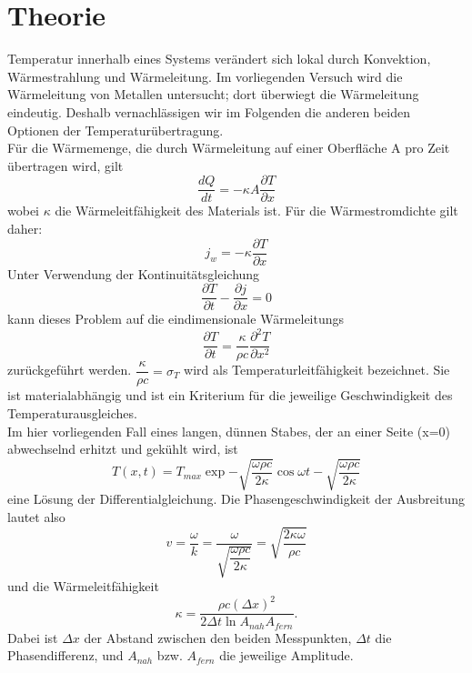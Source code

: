 \section{Theorie}
\label{sec:Theorie}

Temperatur innerhalb eines Systems verändert sich lokal durch Konvektion, Wärmestrahlung
und Wärmeleitung. Im vorliegenden Versuch wird die Wärmeleitung von Metallen untersucht;
dort überwiegt die Wärmeleitung eindeutig. Deshalb vernachlässigen wir im Folgenden die 
anderen beiden Optionen der Temperaturübertragung.\\
Für die Wärmemenge, die durch Wärmeleitung auf einer Oberfläche A pro Zeit übertragen 
wird, gilt
\begin{equation}
    \dfrac{dQ}{dt}=-\kappa A \dfrac{\partial T}{\partial x}
\end{equation}
wobei $\kappa$ die Wärmeleitfähigkeit des Materials ist. Für die Wärmestromdichte gilt 
daher:
\begin{equation}
    j_w=-\kappa \dfrac{\partial T}{\partial x}
\end{equation}
Unter Verwendung der Kontinuitätsgleichung
\begin{equation}
    \dfrac{\partial T}{\partial t}-\dfrac{\partial j}{\partial x}=0
\end{equation}
kann dieses Problem auf die eindimensionale Wärmeleitungs
\begin{equation}
    \dfrac{\partial T}{\partial t}=\dfrac{\kappa}{\rho c}\dfrac{\partial^2 T}{\partial x^2}
\end{equation}
zurückgeführt werden. $\dfrac{\kappa}{\rho c} = \sigma_T$ wird als Temperaturleitfähigkeit
bezeichnet. Sie ist materialabhängig und ist ein Kriterium für die jeweilige Geschwindigkeit 
des Temperaturausgleiches.\\
Im hier vorliegenden Fall eines langen, dünnen Stabes, der an einer Seite (x=0) abwechselnd 
erhitzt und gekühlt wird, ist 
\begin{equation}
    T(x,t)=T_{max} \exp{-\sqrt{\dfrac{\omega \rho c}{2 \kappa}}} \cos{\omega t - \sqrt{
        \dfrac{\omega \rho c}{2 \kappa}}}
\end{equation}
eine Lösung der Differentialgleichung. Die Phasengeschwindigkeit der Ausbreitung lautet also
\begin{equation}
    v = \dfrac{\omega}{k}=\dfrac{\omega}{\sqrt{\dfrac{\omega \rho c}{2 \kappa}}}
      = \sqrt{\dfrac{2 \kappa \omega}{\rho c}}
\end{equation}
und die Wärmeleitfähigkeit
\begin{equation}
    \kappa = \dfrac{\rho c (\Delta x)^2}{2 \Delta t \ln{A_{nah}}{A_{fern}}}.
\end{equation}
Dabei ist $\Delta x$ der Abstand zwischen den beiden Messpunkten, $\Delta t$ die Phasendifferenz,
und $A_{nah}$ bzw. $A_{fern}$ die jeweilige Amplitude.